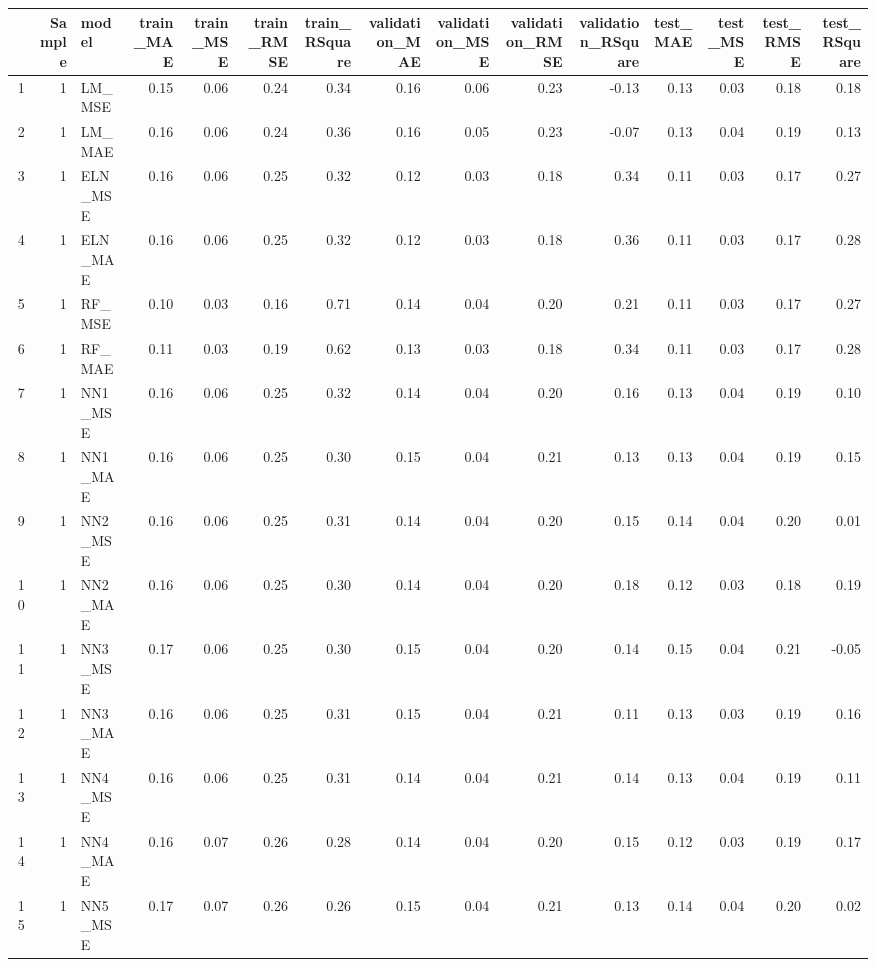 \begin{longtable}{rrlrrrrrrrrrrrr}
  \hline
 & Sample & model & train\_MAE & train\_MSE & train\_RMSE & train\_RSquare & validation\_MAE & validation\_MSE & validation\_RMSE & validation\_RSquare & test\_MAE & test\_MSE & test\_RMSE & test\_RSquare \\ 
  \hline
1 &   1 & LM\_MSE & 0.15 & 0.06 & 0.24 & 0.34 & 0.16 & 0.06 & 0.23 & -0.13 & 0.13 & 0.03 & 0.18 & 0.18 \\ 
  2 &   1 & LM\_MAE & 0.16 & 0.06 & 0.24 & 0.36 & 0.16 & 0.05 & 0.23 & -0.07 & 0.13 & 0.04 & 0.19 & 0.13 \\ 
  3 &   1 & ELN\_MSE & 0.16 & 0.06 & 0.25 & 0.32 & 0.12 & 0.03 & 0.18 & 0.34 & 0.11 & 0.03 & 0.17 & 0.27 \\ 
  4 &   1 & ELN\_MAE & 0.16 & 0.06 & 0.25 & 0.32 & 0.12 & 0.03 & 0.18 & 0.36 & 0.11 & 0.03 & 0.17 & 0.28 \\ 
  5 &   1 & RF\_MSE & 0.10 & 0.03 & 0.16 & 0.71 & 0.14 & 0.04 & 0.20 & 0.21 & 0.11 & 0.03 & 0.17 & 0.27 \\ 
  6 &   1 & RF\_MAE & 0.11 & 0.03 & 0.19 & 0.62 & 0.13 & 0.03 & 0.18 & 0.34 & 0.11 & 0.03 & 0.17 & 0.28 \\ 
  7 &   1 & NN1\_MSE & 0.16 & 0.06 & 0.25 & 0.32 & 0.14 & 0.04 & 0.20 & 0.16 & 0.13 & 0.04 & 0.19 & 0.10 \\ 
  8 &   1 & NN1\_MAE & 0.16 & 0.06 & 0.25 & 0.30 & 0.15 & 0.04 & 0.21 & 0.13 & 0.13 & 0.04 & 0.19 & 0.15 \\ 
  9 &   1 & NN2\_MSE & 0.16 & 0.06 & 0.25 & 0.31 & 0.14 & 0.04 & 0.20 & 0.15 & 0.14 & 0.04 & 0.20 & 0.01 \\ 
  10 &   1 & NN2\_MAE & 0.16 & 0.06 & 0.25 & 0.30 & 0.14 & 0.04 & 0.20 & 0.18 & 0.12 & 0.03 & 0.18 & 0.19 \\ 
  11 &   1 & NN3\_MSE & 0.17 & 0.06 & 0.25 & 0.30 & 0.15 & 0.04 & 0.20 & 0.14 & 0.15 & 0.04 & 0.21 & -0.05 \\ 
  12 &   1 & NN3\_MAE & 0.16 & 0.06 & 0.25 & 0.31 & 0.15 & 0.04 & 0.21 & 0.11 & 0.13 & 0.03 & 0.19 & 0.16 \\ 
  13 &   1 & NN4\_MSE & 0.16 & 0.06 & 0.25 & 0.31 & 0.14 & 0.04 & 0.21 & 0.14 & 0.13 & 0.04 & 0.19 & 0.11 \\ 
  14 &   1 & NN4\_MAE & 0.16 & 0.07 & 0.26 & 0.28 & 0.14 & 0.04 & 0.20 & 0.15 & 0.12 & 0.03 & 0.19 & 0.17 \\ 
  15 &   1 & NN5\_MSE & 0.17 & 0.07 & 0.26 & 0.26 & 0.15 & 0.04 & 0.21 & 0.13 & 0.14 & 0.04 & 0.20 & 0.02 \\ 

\end{longtable}

